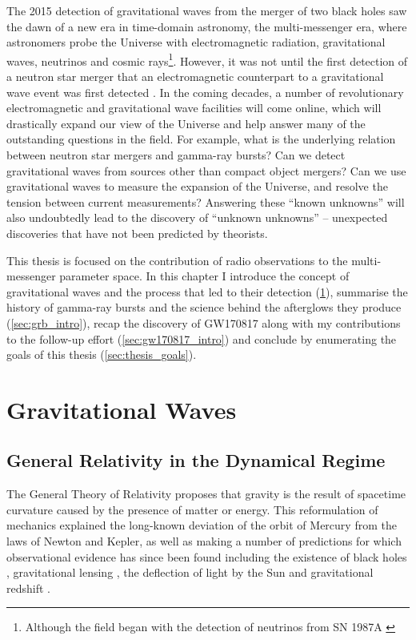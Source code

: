 The 2015 detection of gravitational waves from the merger of two black holes \citep{2016PhRvL.116f1102A} saw the dawn of a new era in time-domain astronomy, the multi-messenger era, where astronomers probe the Universe with electromagnetic radiation, gravitational waves, neutrinos and cosmic rays\footnote{Although the field began with the detection of neutrinos from SN 1987A \citep{1987PhRvL..58.1494B,1987PhRvL..58.1490H}}. However, it was not until the first detection of a neutron star merger \citep{2017PhRvL.119p1101A} that an electromagnetic counterpart to a gravitational wave event was first detected \citep{2017ApJ...848L..12A}. In the coming decades, a number of revolutionary electromagnetic and gravitational wave facilities will come online, which will drastically expand our view of the Universe and help answer many of the outstanding questions in the field. For example, what is the underlying relation between neutron star mergers and gamma-ray bursts? Can we detect gravitational waves from sources other than compact object mergers? Can we use gravitational waves to measure the expansion of the Universe, and resolve the tension between current measurements? Answering these ``known unknowns'' will also undoubtedly lead to the discovery of ``unknown unknowns'' -- unexpected discoveries that have not been predicted by theorists.

This thesis is focused on the contribution of radio observations to the multi-messenger parameter space. In this chapter I introduce the concept of gravitational waves and the process that led to their detection (\cref{sec:gw_intro}), summarise the history of gamma-ray bursts and the science behind the afterglows they produce (\cref{sec:grb_intro}), recap the discovery of GW170817 along with my contributions to the follow-up effort (\cref{sec:gw170817_intro}) and conclude by enumerating the goals of this thesis (\cref{sec:thesis_goals}).



\section{Gravitational Waves}
\label{sec:gw_intro}
\subsection{General Relativity in the Dynamical Regime}
The General Theory of Relativity proposes that gravity is the result of spacetime curvature caused by the presence of matter or energy. This reformulation of mechanics explained the long-known deviation of the orbit of Mercury from the laws of Newton and Kepler, as well as making a number of predictions for which observational evidence has since been found including the existence of black holes \citep{1972Natur.235...37W,2019ApJ...875L...1E}, gravitational lensing \citep{1979Natur.279..381W}, the deflection of light by the Sun \citep{1920RSPTA.220..291D} and gravitational redshift \citep{1925Obs....48..337A,1954ApJ...120..316P}.

